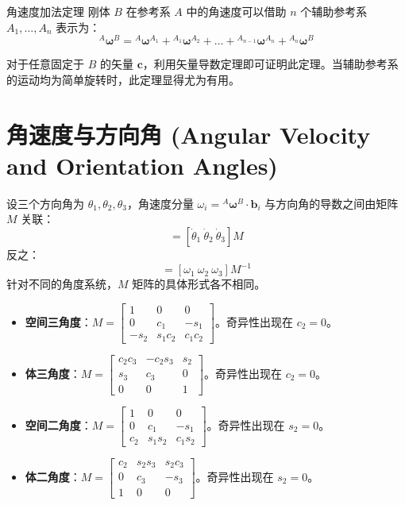 \begin{myTheorem}{角速度加法定理}
刚体 \(B\) 在参考系 \(A\) 中的角速度可以借助 \(n\) 个辅助参考系 \(A_1, \dots, A_n\) 表示为：
\begin{equation}
{}^A \boldsymbol{\omega}^B = {}^A \boldsymbol{\omega}^{A_1} + {}^{A_1} \boldsymbol{\omega}^{A_2} + \dots + {}^{A_{n-1}} \boldsymbol{\omega}^{A_n} + {}^{A_n} \boldsymbol{\omega}^B \tag{1}
\end{equation}
\end{myTheorem}

对于任意固定于 \(B\) 的矢量 \(\mathbf{c}\)，利用矢量导数定理即可证明此定理。当辅助参考系的运动均为简单旋转时，此定理显得尤为有用。

\section{角速度与方向角 (Angular Velocity and Orientation Angles)}

设三个方向角为 \(\theta_1, \theta_2, \theta_3\)，角速度分量 \(\omega_i = {}^A \boldsymbol{\omega}^B \cdot \mathbf{b}_i\) 与方向角的导数之间由矩阵 \(M\) 关联：
\begin{equation}
[\omega_1 \ \omega_2 \ \omega_3] = [\dot{\theta}_1 \ \dot{\theta}_2 \ \dot{\theta}_3] M \tag{1}
\end{equation}
反之：
\begin{equation}
[\dot{\theta}_1 \ \dot{\theta}_2 \ \dot{\theta}_3] = [\omega_1 \ \omega_2 \ \omega_3] M^{-1} \tag{2}
\end{equation}
针对不同的角度系统，\(M\) 矩阵的具体形式各不相同。
\begin{itemize}
    \item \textbf{空间三角度}：\(M = \begin{bmatrix} 1 & 0 & 0 \\ 0 & c_1 & -s_1 \\ -s_2 & s_1 c_2 & c_1 c_2 \end{bmatrix}\)。奇异性出现在 \(c_2 = 0\)。
    \item \textbf{体三角度}：\(M = \begin{bmatrix} c_2 c_3 & -c_2 s_3 & s_2 \\ s_3 & c_3 & 0 \\ 0 & 0 & 1 \end{bmatrix}\)。奇异性出现在 \(c_2 = 0\)。
    \item \textbf{空间二角度}：\(M = \begin{bmatrix} 1 & 0 & 0 \\ 0 & c_1 & -s_1 \\ c_2 & s_1 s_2 & c_1 s_2 \end{bmatrix}\)。奇异性出现在 \(s_2 = 0\)。
    \item \textbf{体二角度}：\(M = \begin{bmatrix} c_2 & s_2 s_3 & s_2 c_3 \\ 0 & c_3 & -s_3 \\ 1 & 0 & 0 \end{bmatrix}\)。奇异性出现在 \(s_2 = 0\)。
\end{itemize}

